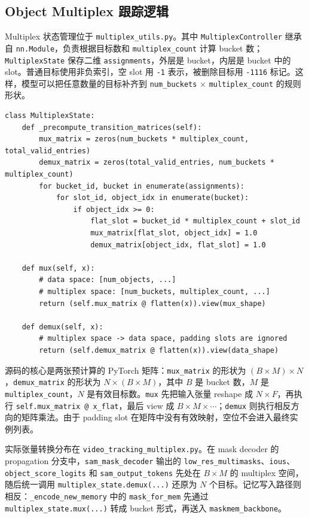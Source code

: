 \documentclass[UTF8,a4paper,zihao=-4,fontset=none]{ctexart}
\begin{document}
\subsection{Object Multiplex 跟踪逻辑}

Multiplex 状态管理位于 \texttt{multiplex\_utils.py}。其中 \texttt{MultiplexController} 继承自 \texttt{nn.Module}，负责根据目标数和 \texttt{multiplex\_count} 计算 bucket 数；\texttt{MultiplexState} 保存二维 \texttt{assignments}，外层是 bucket，内层是 bucket 中的 slot。普通目标使用非负索引，空 slot 用 \texttt{-1} 表示，被删除目标用 \texttt{-1116} 标记。这样，模型可以把任意数量的目标补齐到 \texttt{num\_buckets} $\times$ \texttt{multiplex\_count} 的规则形状。

\begin{lstlisting}[style=pythoncode,caption={MultiplexState 中 mux 和 demux 的简化逻辑}]
class MultiplexState:
    def _precompute_transition_matrices(self):
        mux_matrix = zeros(num_buckets * multiplex_count, total_valid_entries)
        demux_matrix = zeros(total_valid_entries, num_buckets * multiplex_count)
        for bucket_id, bucket in enumerate(assignments):
            for slot_id, object_idx in enumerate(bucket):
                if object_idx >= 0:
                    flat_slot = bucket_id * multiplex_count + slot_id
                    mux_matrix[flat_slot, object_idx] = 1.0
                    demux_matrix[object_idx, flat_slot] = 1.0

    def mux(self, x):
        # data space: [num_objects, ...]
        # multiplex space: [num_buckets, multiplex_count, ...]
        return (self.mux_matrix @ flatten(x)).view(mux_shape)

    def demux(self, x):
        # multiplex space -> data space, padding slots are ignored
        return (self.demux_matrix @ flatten(x)).view(data_shape)
\end{lstlisting}

源码的核心是两张预计算的 PyTorch 矩阵：\texttt{mux\_matrix} 的形状为 $(B \times M) \times N$，\texttt{demux\_matrix} 的形状为 $N \times (B \times M)$，其中 $B$ 是 bucket 数，$M$ 是 \texttt{multiplex\_count}，$N$ 是有效目标数。\texttt{mux} 先把输入张量 reshape 成 $N \times F$，再执行 \texttt{self.mux\_matrix @ x\_flat}，最后 view 成 $B \times M \times \cdots$；\texttt{demux} 则执行相反方向的矩阵乘法。由于 padding slot 在矩阵中没有有效映射，空位不会进入最终实例列表。

实际张量转换分布在 \texttt{video\_tracking\_multiplex.py}。在 mask decoder 的 propagation 分支中，\texttt{sam\_mask\_decoder} 输出的 \texttt{low\_res\_multimasks}、\texttt{ious}、\texttt{object\_score\_logits} 和 \texttt{sam\_output\_tokens} 先处在 $B \times M$ 的 multiplex 空间，随后统一调用 \texttt{multiplex\_state.demux(...)} 还原为 $N$ 个目标。记忆写入路径则相反：\texttt{\_encode\_new\_memory} 中的 \texttt{mask\_for\_mem} 先通过 \texttt{multiplex\_state.mux(...)} 转成 bucket 形式，再送入 \texttt{maskmem\_backbone}。
\end{document}
